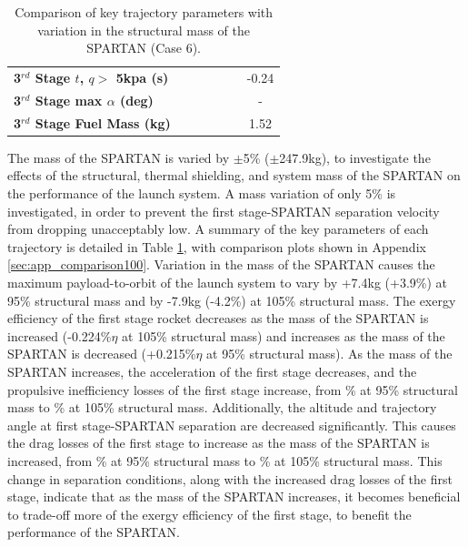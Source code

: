 \begin{table}[ht]
\begin{tabular}{l c c c c c c}
		\textbf{3$^{rd}$ Stage $t$, $q >$ 5kpa (s)}
		& \thirdqOverFivemSPARTANNinetyFiveNoReturn
		& \thirdqOverFivemSPARTANNinetySevenFiveNoReturn
		& \thirdqOverFivemSPARTANStandardNoReturn
		& \thirdqOverFivemSPARTANOneHundredTwoFiveNoReturn
		& \thirdqOverFivemSPARTANOneHundredFiveNoReturn
		&-0.24
		\\
		\textbf{3$^{rd}$ Stage max $\alpha$ (deg)}
		& \thirdmaxAoAmSPARTANNinetyFiveNoReturn
		& \thirdmaxAoAmSPARTANNinetySevenFiveNoReturn
		& \thirdmaxAoAmSPARTANStandardNoReturn
		& \thirdmaxAoAmSPARTANOneHundredTwoFiveNoReturn
		& \thirdmaxAoAmSPARTANOneHundredFiveNoReturn
		& -
		\\
		\textbf{3$^{rd}$ Stage Fuel Mass (kg)}
		& \thirdmFuelmSPARTANNinetyFiveNoReturn
		& \thirdmFuelmSPARTANNinetySevenFiveNoReturn
		& \thirdmFuelmSPARTANStandardNoReturn
		& \thirdmFuelmSPARTANOneHundredTwoFiveNoReturn
		& \thirdmFuelmSPARTANOneHundredFiveNoReturn
		&1.52
		\\
		\hline 
	\end{tabular}  
\caption{Comparison of key trajectory parameters with variation in the structural mass of the SPARTAN (Case 6).}
\label{tab:comparison100}
	
\end{table}


The mass of the SPARTAN is varied by $\pm$5\% ($\pm$247.9kg), to investigate the effects of the structural, thermal shielding, and system mass of the SPARTAN on the performance of the launch system. A mass variation of only 5\% is investigated, in order to prevent the first stage-SPARTAN separation velocity from dropping unacceptably low. A summary of the key parameters of each trajectory is detailed in Table \ref{tab:comparison100}, with comparison plots shown in Appendix \ref{sec:app_comparison100}.
Variation in the mass of the SPARTAN causes the maximum payload-to-orbit of the launch system to vary by +7.4kg (+3.9\%) at 95\% structural mass and by -7.9kg (-4.2\%) at 105\% structural mass. 
The exergy efficiency of the first stage rocket decreases as the mass of the SPARTAN is increased (-0.224\%$\eta$  at 105\% structural mass) and increases as the mass of the SPARTAN is decreased (+0.215\%$\eta$  at 95\% structural mass). As the mass of the SPARTAN increases, the acceleration of the first stage decreases, and the propulsive inefficiency losses of the first stage increase, from \PlossoneCombinedmSPARTANNinetyFiveNoReturn\% at 95\% structural mass to \PlossoneCombinedmSPARTANOneHundredFiveNoReturn\% at 105\% structural mass.
Additionally, the altitude and trajectory angle at first stage-SPARTAN separation are decreased significantly. This causes the drag losses of the first stage to increase as the mass of the SPARTAN is increased, from \WDonemSPARTANNinetyFiveNoReturn\% at 95\% structural mass to \WDonemSPARTANOneHundredFiveNoReturn\% at 105\% structural mass. This change in separation conditions, along with the increased drag losses of the first stage, indicate that as the mass of the SPARTAN increases, it becomes beneficial to trade-off more of the exergy efficiency of the first stage, to benefit the performance of the SPARTAN. 

